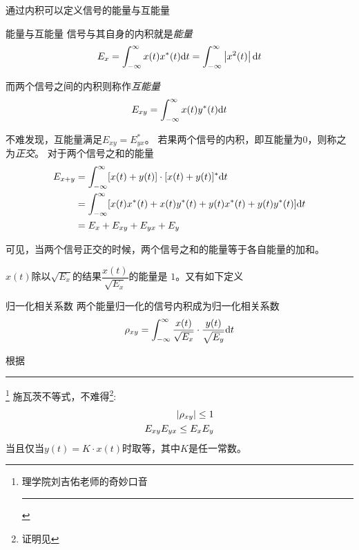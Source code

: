     通过内积可以定义信号的能量与互能量
    \begin{mydef}{能量与互能量}\label{def:energy}
        信号与其自身的内积就是\emph{能量}
        \begin{equation}
            E_x=\int_{-\infty}^{\infty}x(t)x^*(t)\text{\upshape d} t=\int_{-\infty}^{\infty}\left\vert x^2(t) \right\vert\text{\upshape d} t
        \end{equation}

        而两个信号之间的内积则称作\emph{互能量}
        \begin{equation}
            E_{xy}=\int_{-\infty}^{\infty}x(t)y^*(t)\text{\upshape d} t
        \end{equation}
    \end{mydef}
    不难发现，互能量满足$E_{xy}=E_{yx}^*$。
    若果两个信号的内积，即互能量为0，则称之为\emph{正交}。
    对于两个信号之和的能量
    \begin{equation}
        \begin{split}
            E_{x+y}&=\int_{-\infty}^{\infty}[x(t)+y(t)]\cdot[x(t)+y(t)]^*\text{\upshape d} t\\
                   &=\int_{-\infty}^{\infty}[x(t)x^*(t)+x(t)y^*(t)+y(t)x^*(t)+y(t)y^*(t)]\text{\upshape d} t\\
                   &=E_x+E_{xy}+E_{yx}+E_y 
        \end{split}
    \end{equation}

    可见，当两个信号正交的时候，两个信号之和的能量等于各自能量的加和。
    
    $x(t)$除以$\sqrt{E_x}$的结果$\dfrac{x(t)}{\sqrt{E_x}}$的能量是 $1$。又有如下定义
    \begin{mydef}{归一化相关系数}
        两个能量归一化的信号内积成为归一化相关系数
        \begin{equation}\label{eq:Correlation-coefficient}
            \rho_{xy}=\int_{-\infty}^{\infty}\frac{x(t)}{\sqrt{E_x}}\cdot\frac{y(t)}{\sqrt{E_y}}\text{\upshape d} t
        \end{equation}
    \end{mydef}

    根据\makebox[0pt][l]{\rule[0.3ex]{3em}{0.7pt}}\rule[1.2ex]{3em}{0.7pt}\footnote{理学院刘吉佑老师的奇妙口音\hspace{-13em}\rule[0.7ex]{13em}{0.7pt}}
    施瓦茨不等式，不难得\footnote{证明见}:
    \begin{align}
        \left\vert \rho_{xy} \right\vert\leq 1\\
        E_{xy}E_{yx}\leq E_xE_y
    \end{align}
    当且仅当$y(t)=K\cdot x(t)$时取等，其中$K$是任一常数。

